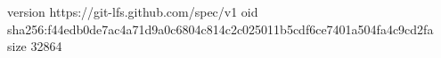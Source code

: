 version https://git-lfs.github.com/spec/v1
oid sha256:f44edb0de7ac4a71d9a0c6804c814c2c025011b5cdf6ce7401a504fa4c9cd2fa
size 32864
